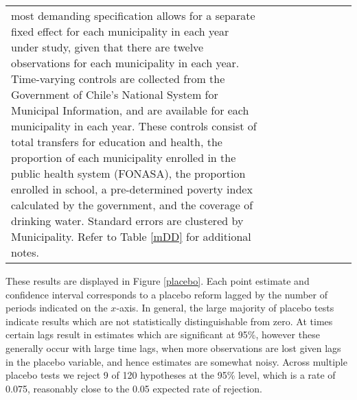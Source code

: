\documentclass[12pt]{article}
\begin{document}
\begin{spacing}{1.4}
\begin{landscape}
\begin{table}
\begin{center}
{\begin{tabular}{lcccccccc}
{{          most demanding specification allows for a separate fixed effect for each
          municipality in each year under study, given that there are twelve
          observations for each municipality in each year.  Time-varying controls are
          collected from the Government of Chile's National System for Municipal Information,
          and are available for each municipality in each year.  These controls consist
          of total transfers for education and health, the proportion of each municipality
          enrolled in the public health system (FONASA), the proportion enrolled in school,
          a pre-determined poverty index calculated by the government, and the coverage
          of drinking water.  Standard errors are clustered by Municipality. Refer
          to Table \ref{mDD} for additional notes.}} \\
    \end{tabular}}
  \end{center}
\end{table}
\end{landscape}


These results are displayed in Figure \ref{placebo}.  Each point
estimate and confidence interval corresponds to a placebo reform
lagged by the number of periods indicated on the $x$-axis.  In
general, the large majority of placebo tests indicate results
which are not statistically distinguishable from zero.  At times
certain lags result in estimates which are significant at 95\%,
however these generally occur with large time lags, when more
observations are lost given lags in the placebo variable, and hence
estimates are somewhat noisy.  Across multiple placebo tests
we reject 9 of 120 hypotheses at the 95\% level, which is a rate
of 0.075, reasonably close to the 0.05 expected rate of rejection.


\end{spacing}
\end{document}
